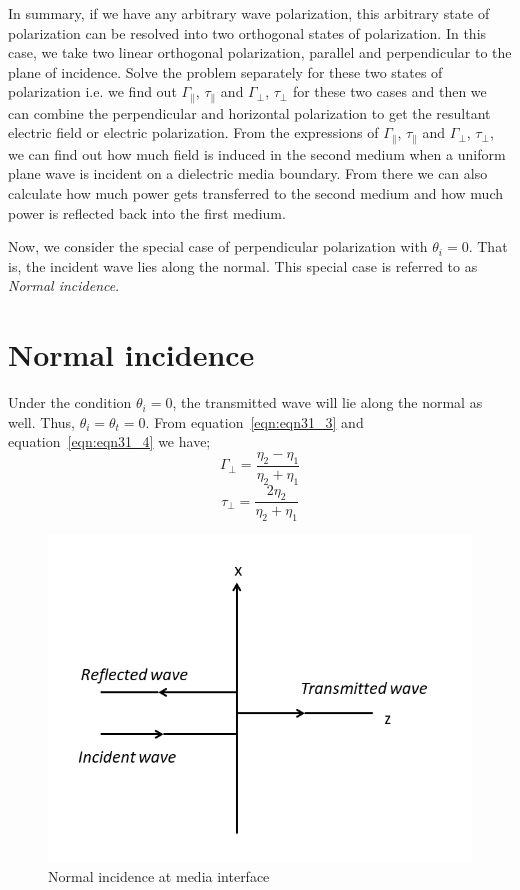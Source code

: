 In summary, if we have any arbitrary wave polarization, this arbitrary state of polarization can be resolved into two orthogonal states of polarization. In this case, we take two linear orthogonal polarization, parallel and perpendicular to the plane of incidence. Solve the problem separately for these two states of polarization i.e. we find out $\Gamma_{\parallel}$,  $\tau_{\parallel}$ and $\Gamma_{\perp}$, $\tau_{\perp}$ for these two cases and then we can combine the perpendicular and horizontal polarization to get the resultant electric field or electric polarization. From the expressions of $\Gamma_{\parallel}$,  $\tau_{\parallel}$ and $\Gamma_{\bot}$, $\tau_{\bot}$, we can find out how much field is induced in the second medium when a uniform plane wave is incident on a dielectric media boundary. From there we can also calculate how much power gets transferred to the second medium and how much power is reflected back into the first medium.

Now, we consider the special case of perpendicular polarization with  $\theta_{i} = 0$. That is, the incident wave lies along the normal. This special case is referred to as \emph{Normal incidence}.

\section{Normal incidence} 

Under the condition $\theta_{i} = 0$, the transmitted wave will lie along the normal as well. Thus,  $\theta_{i} = \theta_{t} = 0$. From equation~\ref{eqn:eqn31_3} and equation~\ref{eqn:eqn31_4} we have;
\begin{equation}
\Gamma_{\perp} = \frac{\eta_{2} - \eta_{1}}{\eta_{2} + \eta_{1}}
\end{equation}
\begin{equation}
\tau_{\perp} = \frac{2 \eta_{2}}{\eta_{2} + \eta_{1}}
\end{equation}

\begin{figure}[h]
\centering
\includegraphics[scale=0.6]{graphics/normal_incidence1}
\caption{Normal incidence at media interface}
\label{fig:16}
\end{figure}

